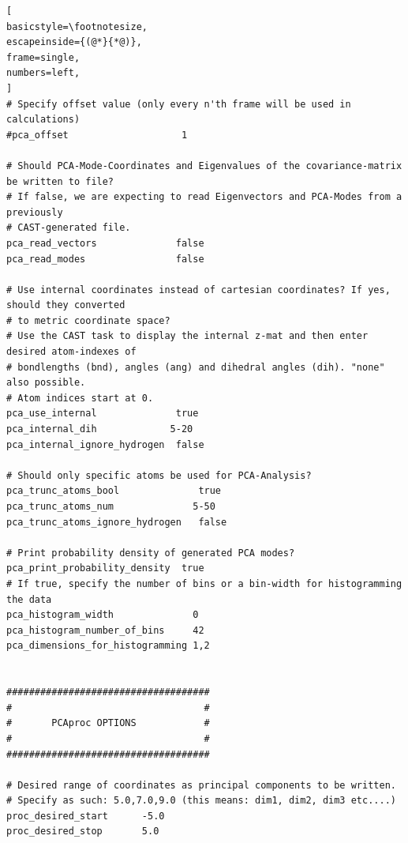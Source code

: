 \documentclass[a4paper,11pt]{scrartcl}
\begin{document}
\begin{lstlisting}[
basicstyle=\footnotesize,
escapeinside={(@*}{*@)},
frame=single,
numbers=left,
]
# Specify offset value (only every n'th frame will be used in calculations)
#pca_offset                    1

# Should PCA-Mode-Coordinates and Eigenvalues of the covariance-matrix be written to file?
# If false, we are expecting to read Eigenvectors and PCA-Modes from a previously 
# CAST-generated file.
pca_read_vectors              false
pca_read_modes                false

# Use internal coordinates instead of cartesian coordinates? If yes, should they converted
# to metric coordinate space?
# Use the CAST task to display the internal z-mat and then enter desired atom-indexes of
# bondlengths (bnd), angles (ang) and dihedral angles (dih). "none" also possible.
# Atom indices start at 0.
pca_use_internal              true
pca_internal_dih             5-20
pca_internal_ignore_hydrogen  false

# Should only specific atoms be used for PCA-Analysis?
pca_trunc_atoms_bool              true
pca_trunc_atoms_num              5-50
pca_trunc_atoms_ignore_hydrogen   false

# Print probability density of generated PCA modes?
pca_print_probability_density  true
# If true, specify the number of bins or a bin-width for histogramming the data
pca_histogram_width              0
pca_histogram_number_of_bins     42
pca_dimensions_for_histogramming 1,2


####################################
#                                  #
#     	PCAproc OPTIONS            #
#                                  #
####################################

# Desired range of coordinates as principal components to be written.
# Specify as such: 5.0,7.0,9.0 (this means: dim1, dim2, dim3 etc....)
proc_desired_start      -5.0
proc_desired_stop       5.0
\end{lstlisting}
\end{document}

